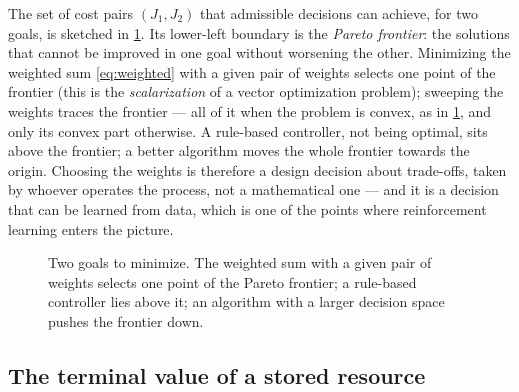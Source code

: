 The set of cost pairs $(J_1, J_2)$ that admissible decisions can achieve, for two goals, is
sketched in \cref{fig:pareto}. Its lower-left boundary is the \emph{Pareto frontier}: the
solutions that cannot be improved in one goal without worsening the other. Minimizing the
weighted sum \eqref{eq:weighted} with a given pair of weights selects one point of the frontier
(this is the \emph{scalarization} of a vector optimization problem); sweeping the weights traces
the frontier --- all of it when the problem is convex, as in \cref{fig:pareto}, and only its
convex part otherwise. A rule-based controller, not being optimal, sits above the frontier; a better
algorithm moves the whole frontier towards the origin. Choosing the weights is therefore a
design decision about trade-offs, taken by whoever operates the process, not a mathematical one
--- and it is a decision that can be learned from data, which is one of the points where
reinforcement learning enters the picture.

\begin{figure}[t]
\centering
{}
\caption{Two goals to minimize. The weighted sum with a given pair of weights selects one point
of the Pareto frontier; a rule-based controller lies above it; an algorithm with a larger
decision space pushes the frontier down.}
\label{fig:pareto}
\end{figure}

\subsection{The terminal value of a stored resource}

